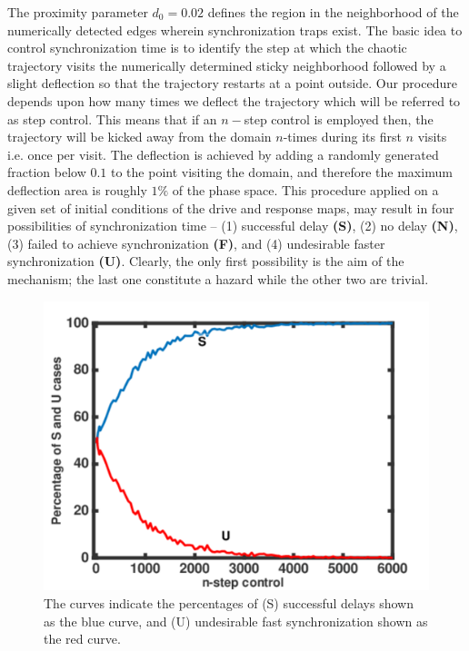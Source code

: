 \documentclass[reprint,amsmath,amssymb,aps,pre]{revtex4-1}
\begin{document}
The proximity parameter $d_0 = 0.02$ defines the region in the neighborhood of 
the numerically detected edges wherein synchronization traps exist. The basic 
idea to control synchronization time is to identify the step at which the 
chaotic trajectory visits the numerically determined sticky neighborhood 
followed by a slight deflection so that the trajectory restarts at a point 
outside.  Our procedure depends upon how many times we deflect the trajectory  
which will be referred to as step control. This means that if an $n-$step 
control is  employed then, the trajectory will be kicked away from the domain 
$n$-times during its first $n$ visits i.e. once per visit. The deflection is 
achieved by adding a randomly generated fraction below $0.1$ to the point 
visiting the domain, and therefore the maximum deflection area is roughly 
$1\%$ of the phase space.  This procedure applied on a given set of initial 
conditions of the drive and response maps, may result in four possibilities of 
synchronization time -- (1) successful delay  \textbf{(S)}, (2) no delay 
\textbf{(N)}, (3) failed to achieve synchronization \textbf{(F)}, and (4) 
undesirable faster synchronization \textbf{(U)}. Clearly, the only first 
possibility is the aim of the mechanism; the last one constitute a hazard 
while the other two are trivial. 
\begin{figure}[h]
	\includegraphics[scale=0.42]{S_U_Percent}
	\caption{\label{fig:Control_success}\footnotesize The curves indicate the 
		percentages of (S) successful delays shown as the blue curve, and (U) 
		undesirable fast synchronization shown as the red curve. }
\end{figure}
\end{document}
